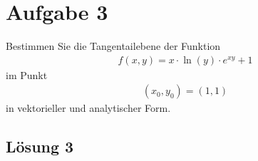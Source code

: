 \documentclass[main.tex]{subfiles}
\begin{document}
\section{Aufgabe 3}
Bestimmen Sie die Tangentailebene der Funktion
\begin{align*}
    f(x, y) = x \cdot \ln(y) \cdot e^{xy} + 1
\end{align*}
im Punkt
\begin{align*}
    (x_0, y_0) = (1, 1)
\end{align*}
in vektorieller und analytischer Form.

\subsection{Lösung 3}
\end{document}
